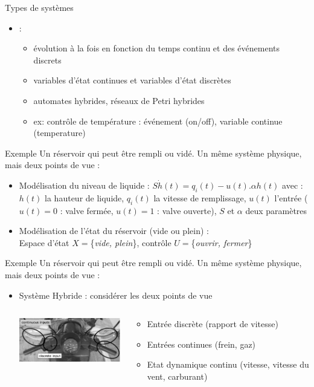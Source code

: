 \documentclass[compress]{beamer}
\begin{document}
\begin{frame}{Types de systèmes}
\begin{itemize} 
\item {} :
	\begin{itemize}
	\item évolution à la fois en fonction du temps  continu  et des événements discrets
	\item  variables d'état continues et  variables d'état discrètes
	\item automates hybrides, réseaux de Petri hybrides
	\item ex: contrôle de température : événement (on/off), variable continue (temperature)
	\end{itemize}
\end{itemize}
\end{frame}

\begin{frame}{Exemple}
Un réservoir qui peut être rempli ou vidé. Un même système physique, mais deux points de vue :
\begin{itemize}
\item Modélisation du niveau de liquide : $S\dot h(t)=q_i(t) - u(t).\alpha h(t)$ avec :\\
{\scriptsize $h(t)$ la hauteur de liquide, $q_i(t)$ la vitesse de remplissage, $u(t)$ l'entrée ($u(t)=0$ : valve fermée, $u(t)=1$ : valve ouverte), $S$ et $\alpha$ deux paramètres}
\item Modélisation de l'état du réservoir (vide ou plein) :\\
Espace d'état $X=$\{\emph{vide, plein}\}, contrôle $U=$\{\emph{ouvrir, fermer}\}
\end{itemize}
\end{frame}

\begin{frame}{Exemple}
Un réservoir qui peut être rempli ou vidé. Un même système physique, mais deux points de vue :
\begin{itemize}
\item Système Hybride : considérer les deux points de vue
\begin{columns}
	\begin{column}{.5\textwidth}
		\includegraphics[width=6cm]{gear}
	\end{column}
	\begin{column}{.5\textwidth}
		\begin{itemize}
		\item Entrée discrète (rapport de vitesse)
		\item Entrées continues (frein, gaz)
		\item Etat dynamique continu (vitesse, vitesse du vent, carburant)
		\end{itemize}
	\end{column}
\end{columns}
\end{itemize}
\end{frame}
\end{document}
